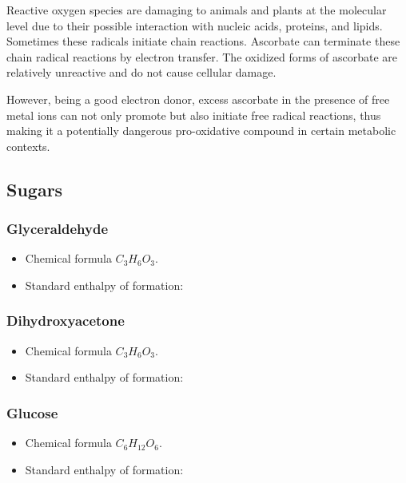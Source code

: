 \documentclass{article}
\begin{document}
Reactive oxygen species are damaging to animals and plants at the molecular level due to
their possible interaction with nucleic acids, proteins, and lipids. Sometimes these
radicals initiate chain reactions. Ascorbate can terminate these chain radical reactions
by electron transfer. The oxidized forms of ascorbate are relatively unreactive and do not
cause cellular damage.

However, being a good electron donor, excess ascorbate in the presence of free metal ions
can not only promote but also initiate free radical reactions, thus making it a
potentially dangerous pro-oxidative compound in certain metabolic contexts.

\subsection{Sugars}

\subsubsection{Glyceraldehyde}
\begin{itemize}
    \item Chemical formula $C_3H_6O_3$.
    \item Standard enthalpy of formation:
\end{itemize}

\subsubsection{Dihydroxyacetone}
\begin{itemize}
    \item Chemical formula $C_3H_6O_3$.
    \item Standard enthalpy of formation:
\end{itemize}

\subsubsection{Glucose}
\begin{itemize}
    \item Chemical formula $C_6H_{12}O_6$.
    \item Standard enthalpy of formation:
\end{itemize}
\end{document}
